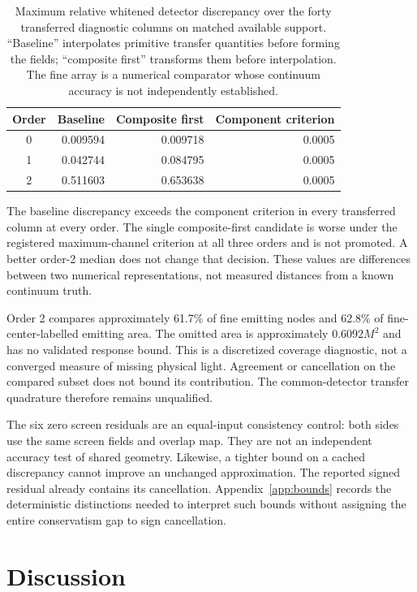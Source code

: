 \begin{table}[htbp]
\centering\small
\caption{Maximum relative whitened detector discrepancy over the forty transferred diagnostic columns on matched available support. ``Baseline'' interpolates primitive transfer quantities before forming the fields; ``composite first'' transforms them before interpolation. The fine array is a numerical comparator whose continuum accuracy is not independently established.}
\label{tab:audit}
\begin{tabular}{c r r r}
\toprule
Order&Baseline&Composite first&Component criterion\\
\midrule
0&0.009594&0.009718&0.0005\\
1&0.042744&0.084795&0.0005\\
2&0.511603&0.653638&0.0005\\
\bottomrule
\end{tabular}
\end{table}

The baseline discrepancy exceeds the component criterion in every transferred column at every order. The single composite-first candidate is worse under the registered maximum-channel criterion at all three orders and is not promoted. A better order-2 median does not change that decision. These values are differences between two numerical representations, not measured distances from a known continuum truth.

Order 2 compares approximately 61.7\% of fine emitting nodes and 62.8\% of fine-center-labelled emitting area. The omitted area is approximately $0.6092M^2$ and has no validated response bound. This is a discretized coverage diagnostic, not a converged measure of missing physical light. Agreement or cancellation on the compared subset does not bound its contribution. The common-detector transfer quadrature therefore remains unqualified.

The six zero screen residuals are an equal-input consistency control: both sides use the same screen fields and overlap map. They are not an independent accuracy test of shared geometry. Likewise, a tighter bound on a cached discrepancy cannot improve an unchanged approximation. The reported signed residual already contains its cancellation. Appendix~\ref{app:bounds} records the deterministic distinctions needed to interpret such bounds without assigning the entire conservatism gap to sign cancellation.

\section{Discussion}\label{sec:discussion}
